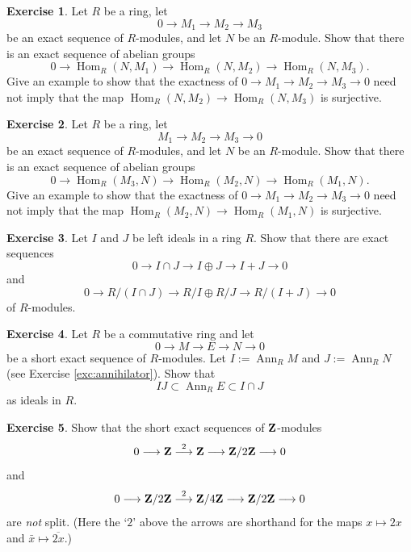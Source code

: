 \documentclass[11pt]{amsbook}
\newcommand{\longto}{\longrightarrow}
\DeclareMathOperator\Hom{Hom}
\DeclareMathOperator\Ann{Ann}
\theoremstyle{plain}
\theoremstyle{definition}
\newtheorem{exercise}{Exercise}
\begin{document}
\begin{exercise} \label{exc:covariant-short-exact-hom}
Let $R$ be a ring,  let
\begin{equation}\label{eq:exc-short-exact-hom}
	0 \longto M_1 \longto M_2 \longto M_3 
\end{equation}
be an exact sequence of $R$-modules, and let $N$ be an $R$-module. Show that there 
is an exact sequence of abelian groups
\[
	0 \longto \Hom_R(N,M_1) \longto \Hom_R(N,M_2) \longto \Hom_R(N,M_3).
\]
Give an example to show that the exactness of $0\to M_1 \to M_2\to M_3\to 0$ need not imply
that the map $\Hom_R(N,M_2)\to \Hom_R(N,M_3)$ is surjective.
\end{exercise}

\begin{exercise}\label{exc:contravariant-short-exact-hom}
Let $R$ be a ring,  let
\[
	 M_1 \longto M_2 \longto M_3 \longto 0
\]
be an exact sequence of $R$-modules, and let $N$ be an $R$-module. Show that there 
is an exact sequence of abelian groups
\[
	0 \longto \Hom_R(M_3,N) \longto \Hom_R(M_2,N) \longto \Hom_R(M_1,N).
\]
Give an example to show that the exactness of $0\to M_1 \to M_2\to M_3\to 0$ need not imply
that the map $\Hom_R(M_2,N)\to \Hom_R(M_1,N)$ is surjective.
\end{exercise}


\begin{exercise}
Let $I$ and $J$ be left ideals in a ring $R$. Show that there are exact sequences
\[
	0 \to I \cap J \to I \oplus J \to I + J \to 0
\]
and
\[
	0 \to R/(I\cap J) \to R/I \oplus R/J \to R/(I+J) \to 0
\]
of $R$-modules. 
\end{exercise}



\begin{exercise}
Let $R$ be a commutative ring and let
\[
	0 \longto M \longto E \longto N \longto 0
\]
be a short exact sequence of $R$-modules. Let $I:=\Ann_R M$ and $J := \Ann_R N$ (see Exercise \ref{exc:annihilator}). Show that
\[
	IJ \subset \Ann_R E \subset I \cap J
\]
as ideals in $R$.
\end{exercise}



\begin{exercise}\label{exc:nonsplit-examples}
Show that the short exact sequences of ${\mathbf{Z}}$-modules
\[
	0 \longto \bZ \overset{2}{\longto} \bZ \longto \bZ/2\bZ \longto 0
\]
and
\[
	0 \longto \bZ/2\bZ \overset{2}{\longto} \bZ/4\bZ \longto \bZ/2\bZ \longto 0
\]
are \emph{not} split. (Here the `$2$' above the arrows are shorthand for the maps $x\mapsto 2x$ and $\bar{x}\mapsto \overline{2x}$.)
\end{exercise}
\end{document}
